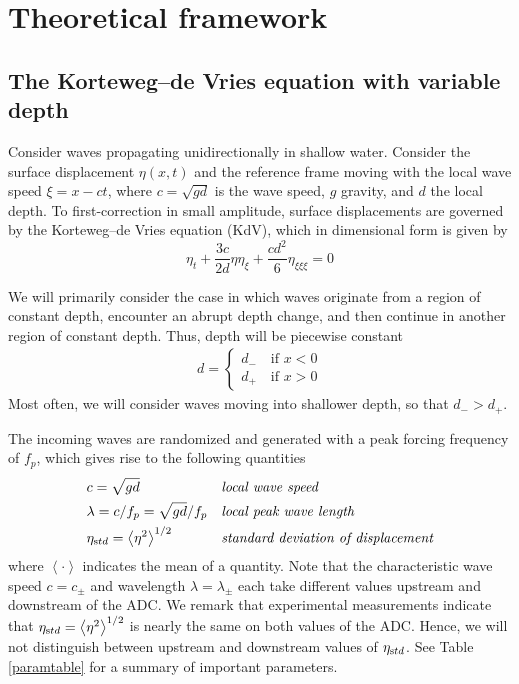 \documentclass[11pt]{article}
\newcommand{\mean}[1]{\left< #1 \right>}
\newcommand{\freqp}{f_p}
\newcommand{\etastd}{\eta_{\text std}}
\newcommand{\depth}{d}
\newcommand{\dup}{\depth_{-}}
\newcommand{\ddn}{\depth_{+}}
\newcommand{\lam}{\lambda}
\newcommand{\lamupdn}{\lam_{\pm}}
\begin{document}
\section{Theoretical framework}

\subsection{The Korteweg–de Vries equation with variable depth}
Consider waves propagating unidirectionally in shallow water. Consider the surface displacement $\eta(x,t)$ and the reference frame moving with the local wave speed $\xi = x - ct$, where $c = \sqrt{g \depth}$ is the wave speed, $g$ gravity, and $\depth$ the local depth.
To first-correction in small amplitude, surface displacements are governed by the Korteweg–de Vries equation (KdV), which in dimensional form is given by \cite{whitham2011linear}
\begin{equation}
\label{KdV}
\eta_t + \frac{3 c}{2 \depth} \eta \eta_{\xi} + \frac{c \depth^2}{6} \eta_{\xi \xi \xi} = 0
\end{equation}

We will primarily consider the case in which waves originate from a region of constant depth, encounter an abrupt depth change, and then continue in another region of constant depth. Thus, depth will be piecewise constant
\begin{align}
\depth = 
\begin{cases}
\dup \quad \mbox{if } x<0 \\
\ddn \quad \mbox{if } x>0
\end{cases}
\end{align}
Most often, we will consider waves moving into shallower depth, so that $\dup > \ddn$. 

The incoming waves are randomized and generated with a peak forcing frequency of $\freqp$, which gives rise to the following quantities
\begin{align}
&c = \sqrt{g \depth}
&&\mbox{\em local wave speed} \\
&\lam = c/\freqp = \sqrt{g \depth} / \freqp
&&\mbox{\em local peak wave length} \\
&\etastd = \mean{\eta^2}^{1/2} 
&&\mbox{\em standard deviation of displacement} \\
\end{align}
where $\mean{\cdot}$ indicates the mean of a quantity. 
Note that the characteristic wave speed $c = c_{\pm}$ and wavelength $\lam = \lamupdn$ each take different values upstream and downstream of the ADC. We remark that experimental measurements indicate that $\etastd = \mean{\eta^2}^{1/2}$ is nearly the same on both values of the ADC. Hence, we will not distinguish between upstream and downstream values of $\etastd$.
%
See Table \ref{paramtable} for a summary of important parameters.
\end{document}
